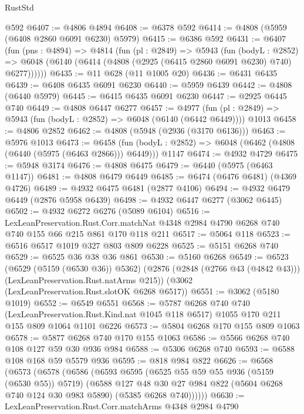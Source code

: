 \begin{lexlean}{RustStd}
\begin{coremodule}
    @592
@6407 := @4806 @4894
@6408 := @6378 @592
@6414 := @4808 (@5959 (@6408 @2860 @6091 @6230) @5979)
@6415 := @6386 @592
@6431 := @6407
    (fun (pns : @4894) =>
    @4814
      (fun (pl : @2849) =>
      @5943
        (fun (bodyL : @2852) =>
        @6048 (@6140 (@6414 (@4808 (@2925 (@6415 @2860 @6091 @6230) @740) @6277))))))
@6435 := @11 @628 (@11 @1005 @20)
@6436 := @6431 @6435
@6439 := @6408 @6435 @6091 @6230
@6440 := @5959 @6439
@6442 := @4808 (@6440 @5979)
@6445 := @6415 @6435 @6091 @6230
@6447 := @2925 @6445 @740
@6449 := @4808 @6447 @6277
@6457 := @4977
    (fun (pl : @2849) => @5943 (fun (bodyL : @2852) => @6048 (@6140 (@6442 @6449))))
    @1013
@6458 := @4806 @2852
@6462 := @4808 (@5948 (@2936 (@3170 @6136)))
@6463 := @5976 @1013
@6473 := @6458
    (fun (bodyL : @2852) => @6048 (@6462 (@4808 (@6440 (@5975 (@6463 @2866))) @6449)))
    @1147
@6474 := @4932 @4729
@6475 := @5948 @3174
@6476 := @4808 @6475
@6479 := @6440 (@5975 (@6463 @1147))
@6481 := @4808 @6479 @6449
@6485 := @6474 (@6476 @6481) (@4369 @4726)
@6489 := @4932 @6475 @6481 (@2877 @4106)
@6494 := @4932 @6479 @6449 (@2876 @5958 @6439)
@6498 := @4932 @6447 @6277 (@3062 @6445)
@6502 := @4932 @6272 @6276 (@5089 @6104)
@6516 := LexLeanPreservation.Rust.Corr.matchNat
    @4348
    @2984
    @4790
    @6268
    @740
    @740
    @155
    @66
    @215
    @861
    @170
    @118
    @211
@6517 := @5064 @118
@6523 := @6516 @6517 @1019 @327 @803 @809 @6228
@6525 := @5151 @6268 @740
@6529 := @6525 @36 @38 @36 @861
@6530 := @5160 @6268
@6549 := @6523
    (@6529 (@5159 (@6530 @36)) @5362)
    (@2876 (@2848 (@2766 @43 (@4842 @43))) (LexLeanPreservation.Rust.natArms @215))
    (@3062 (LexLeanPreservation.Rust.slotOK @6268 @6517))
@6551 := @3062 (@5180 @1019)
@6552 := @6549 @6551
@6568 := @5787
    @6268
    @740
    @740
    (LexLeanPreservation.Rust.Kind.nat @1045 @118 @6517)
    @1055
    @170
    @211
    @155
    @809
    @1064
    @1101
    @6226
@6573 := @5804 @6268 @170 @155 @809 @1063
@6578 := @5877 @6268 @740 @170 @155 @1063
@6586 := @5566 @6268 @740 @108 @127 @59 @30 @936 @984
@6588 := @5306 @6268 @740
@6593 := @6588 @108 @168 @59 @5579 @936
@6595 := @818 @984 @822
@6626 := @6568
    (@6573
      (@6578
        (@6586
          (@6593
            @6595
            (@6525 @55 @59 @55 @936 (@5159 (@6530 @55)) @5719)
            (@6588
              @127
              @48
              @30
              @27
              @984
              @822
              (@5604 @6268 @740 @124 @30 @983 @5890)
              (@5385 @6268 @740))))))
@6630 := LexLeanPreservation.Rust.Corr.matchArms @4348 @2984 @4790

\end{coremodule}
\end{lexlean}
